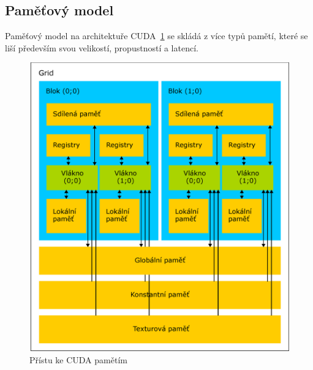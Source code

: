 \subsection{Paměťový model}

Paměťový model na architektuře CUDA~\ref{fig:cudamemaccess} se skládá z více typů pamětí, které se liší především svou velikostí, propustností a latencí.

\begin{figure}[h]
  \centering
  \includegraphics[width=0.6\linewidth]{img/CUDAmemAccess.eps}
  \caption{Přístu ke CUDA pamětím}
  \label{fig:cudamemaccess}
\end{figure}

